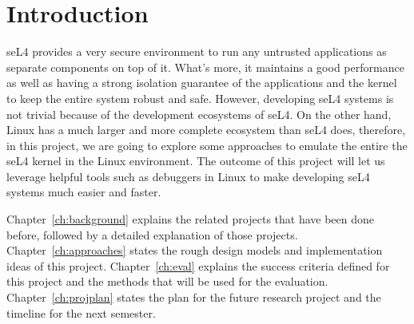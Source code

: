 \chapter{Introduction}\label{ch:intro}

seL4 provides a very secure environment to run any untrusted applications as separate components on top of it. What's more, it maintains a good performance as well as having a strong isolation guarantee of the applications and the kernel to keep the entire system robust and safe. However, developing seL4 systems is not trivial because of the development ecosystems of seL4. On the other hand, Linux has a much larger and more complete ecosystem than seL4 does, therefore, in this project, we are going to explore some approaches to emulate the entire the seL4 kernel in the Linux environment. The outcome of this project will let us leverage helpful tools such as debuggers in Linux to make developing seL4 systems much easier and faster.

Chapter~\ref{ch:background} explains the related projects that have been done before, followed by a detailed explanation of those projects.
Chapter~\ref{ch:approaches} states the rough design models and implementation ideas of this project.
Chapter~\ref{ch:eval} explains the success criteria defined for this project and the methods that will be used for the evaluation.
Chapter~\ref{ch:projplan} states the plan for the future research project and the timeline for the next semester.